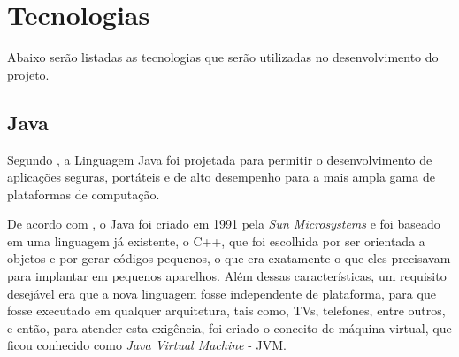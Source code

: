 % 


\section{Tecnologias}

\par Abaixo serão listadas as tecnologias que serão utilizadas no
desenvolvimento do projeto.

\subsection{Java}

\par Segundo , a Linguagem Java foi projetada
para permitir o desenvolvimento de aplicações seguras, portáteis
e de alto desempenho para a mais ampla gama de plataformas de computação.

\par De acordo com , o Java foi
criado em 1991 pela \textit{Sun Microsystems} e foi baseado em uma linguagem já
existente, o C++, que foi escolhida por ser orientada a objetos e
por gerar códigos pequenos, o que era exatamente o que eles precisavam para
implantar em pequenos aparelhos. Além dessas características, um requisito
desejável era que a nova linguagem fosse independente de plataforma, para que
fosse executado em qualquer arquitetura, tais como, TVs, telefones, entre
outros, e então, para atender esta exigência, foi
criado o conceito de máquina virtual, que ficou conhecido como \textit{Java
Virtual Machine} - JVM\footnotemark[2].

